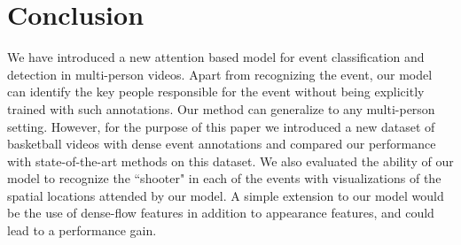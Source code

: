 \section{Conclusion}
We have introduced a new attention based model for event classification and
detection in multi-person videos. Apart from recognizing the event, our model
can identify the key people responsible for the event without being explicitly
trained with such annotations. Our method can generalize to any
multi-person setting. However, for the purpose of this paper we introduced a
new dataset of basketball videos with dense event annotations and compared our
performance with state-of-the-art methods on this dataset.  We also evaluated
the ability of our model to recognize the ``shooter" in each of the events with
visualizations of the spatial locations attended by our model.  A simple
extension to our model would be the use of dense-flow features in addition to
appearance features, and could lead to a performance gain.
